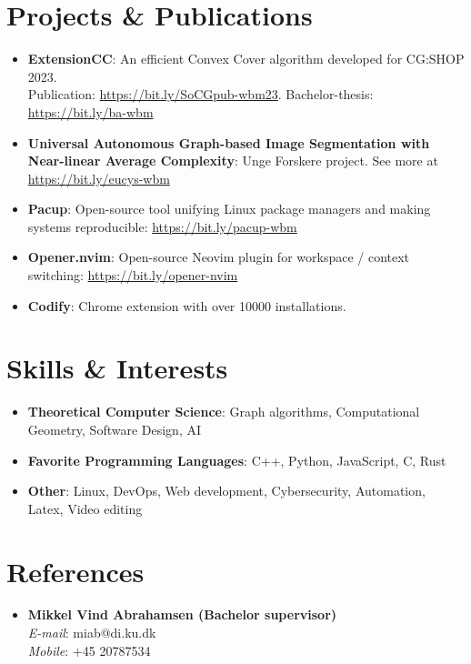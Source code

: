 \documentclass[11pt]{article}
\newcommand{\resumeItem}[2]{
  \item\small{
    \textbf{#1}{: #2 \vspace{-2pt}}
  }
}
\newcommand{\resumeSubItem}[2]{\resumeItem{#1}{#2}\vspace{-4pt}}
\newcommand{\resumeSubHeadingListStart}{\begin{itemize}[leftmargin=*]}
\newcommand{\resumeSubHeadingListEnd}{\end{itemize}}
\begin{document}
\section{Projects \& Publications}
  \resumeSubHeadingListStart
    \resumeSubItem{ExtensionCC}
      {An efficient Convex Cover algorithm developed for CG:SHOP 2023. \\Publication: \href{https://bit.ly/SoCGpub-wbm23}{https://bit.ly/SoCGpub-wbm23}. Bachelor-thesis: \href{https://bit.ly/ba-wbm}{https://bit.ly/ba-wbm}}
    \resumeSubItem{Universal Autonomous Graph-based Image Segmentation with Near-linear Average Complexity}{Unge Forskere project. See more at \href{https://bit.ly/eucys-wbm}{https://bit.ly/eucys-wbm}}
    \resumeSubItem{Pacup}{Open-source tool unifying Linux package managers and making systems reproducible: \href{https://bit.ly/pacup-wbm}{https://bit.ly/pacup-wbm}}
    \resumeSubItem{Opener.nvim}{Open-source Neovim plugin for workspace / context switching: \href{https://bit.ly/opener-nvim}{https://bit.ly/opener-nvim}}
    \resumeSubItem{Codify}{Chrome extension with over 10000 installations.}
  \resumeSubHeadingListEnd

%
\section{Skills \& Interests}
  \resumeSubHeadingListStart
     \resumeSubItem{Theoretical Computer Science}{Graph algorithms, Computational Geometry, Software Design, AI}
     \resumeSubItem{Favorite Programming Languages}{C++, Python, JavaScript, C, Rust}
     \resumeSubItem{Other}{Linux, DevOps, Web development, Cybersecurity, Automation, Latex, Video editing}
 \resumeSubHeadingListEnd
 
\section{References}
  \resumeSubHeadingListStart
      \item\small{
        \textbf{Mikkel Vind Abrahamsen (Bachelor supervisor)}{
            \\\hspace{10pt}\textit{E-mail}: miab@di.ku.dk\\\hspace{10pt}\textit{Mobile}: +45 20787534
        \vspace{-2pt}}
      }\vspace{-4pt}
 \resumeSubHeadingListEnd

\end{document}
